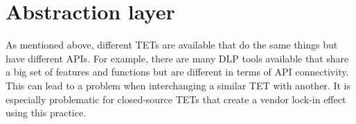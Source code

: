 \section{Abstraction layer}
As mentioned above, different TETs are available that do the same things but have different APIs. For example, there are many DLP tools available that share a big set of features and functions but are different in terms of API connectivity.
This can lead to a problem when interchanging a similar TET with another. It is especially problematic for closed-source TETs that create a vendor lock-in effect using this practice.

